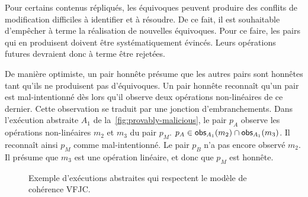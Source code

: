 Pour certains contenus répliqués, les équivoques peuvent produire des conflits de modification difficiles à identifier et à résoudre.
De ce fait, il est souhaitable d'empêcher à terme la réalisation de nouvelles équivoques.
Pour ce faire, les pairs qui en produisent doivent être systématiquement évincés.
Leurs opérations futures devraient donc à terme être rejetées.

De manière optimiste, un pair honnête présume que les autres pairs sont honnêtes tant qu'ils ne produisent pas d'équivoques.
Un pair honnête reconnaît qu'un pair est mal-intentionné dès lors qu'il observe deux opérations non-linéaires de ce dernier.
Cette observation se traduit par une jonction d'embranchements.
Dans l'exécution abstraite $A_1$ de la~\autoref{fig:provably-malicious}, le pair $p_A$ observe les opérations non-linéaires $m_2$ et $m_3$ du pair $p_M$. $p_A \in \operatorname{\mathsf{obs}}_{A_1}(m_2) \cap \operatorname{\mathsf{obs}}_{A_1}(m_3)$.
Il reconnaît ainsi $p_M$ comme mal-intentionné.
Le pair $p_B$ n'a pas encore observé $m_2$. Il présume que $m_3$ est une opération linéaire, et donc que $p_M$ est honnête.

\begin{figure}[htb]
\centering
{}
\caption{Exemple d'exécutions abstraites qui respectent le modèle de cohérence \ac{VFJC}.}\label{fig:provably-malicious}
\end{figure}

